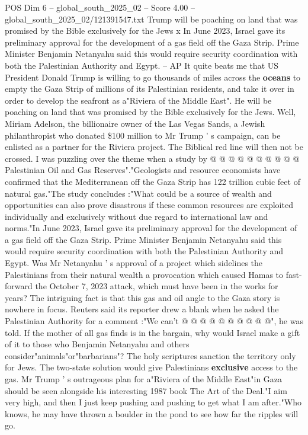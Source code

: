 \begin{textsample}{POS Dim 6 – global\_south\_2025\_02 – Score 4.00 – global\_south\_2025\_02/121391547.txt}  \label{ex:f6_pos_410}
Trump will be poaching on land that was promised by the Bible exclusively for the Jews x In June 2023, Israel gave its preliminary approval for the development of a gas field off the Gaza Strip.
Prime Minister Benjamin Netanyahu said this would require security coordination with both the Palestinian Authority and Egypt. -- AP It quite beats me that US President Donald Trump is willing to go thousands of miles across the \textbf{oceans} to empty the Gaza Strip of millions of its Palestinian residents, and take it over in order to develop the seafront as a"Riviera of the Middle East".
He will be poaching on land that was promised by the Bible exclusively for the Jews.
Well, Miriam Adelson, the billionaire owner of the Las Vegas Sands, a Jewish philanthropist who donated \$100 million to Mr Trump ' s campaign, can be enlisted as a partner for the Riviera project.
The Biblical red line will then not be crossed.
I was puzzling over the theme when a study by @ @ @ @ @ @ @ @ @ @ Palestinian Oil and Gas Reserves"."Geologists and resource economists have confirmed that the Mediterranean off the Gaza Strip has 122 trillion cubic feet of natural gas."The study concludes :"What could be a source of wealth and opportunities can also prove disastrous if these common resources are exploited individually and exclusively without due regard to international law and norms."In June 2023, Israel gave its preliminary approval for the development of a gas field off the Gaza Strip.
Prime Minister Benjamin Netanyahu said this would require security coordination with both the Palestinian Authority and Egypt.
Was Mr Netanyahu ' s approval of a project which sidelines the Palestinians from their natural wealth a provocation which caused Hamas to fast-forward the October 7, 2023 attack, which must have been in the works for years?
The intriguing fact is that this gas and oil angle to the Gaza story is nowhere in focus.
Reuters said its reporter drew a blank when he asked the Palestinian Authority for a comment :"We can't @ @ @ @ @ @ @ @ @ @", he was told.
If the mother of all gas finds is in the bargain, why would Israel make a gift of it to those who Benjamin Netanyahu and others consider"animals"or"barbarians"?
The holy scriptures sanction the territory only for Jews.
The two-state solution would give Palestinians \textbf{exclusive} access to the gas.
Mr Trump ' s outrageous plan for a"Riviera of the Middle East"in Gaza should be seen alongside his interesting 1987 book The Art of the Deal."I aim very high, and then I just keep pushing and pushing to get what I am after."Who knows, he may have thrown a boulder in the pond to see how far the ripples will go.

\end{textsample}
